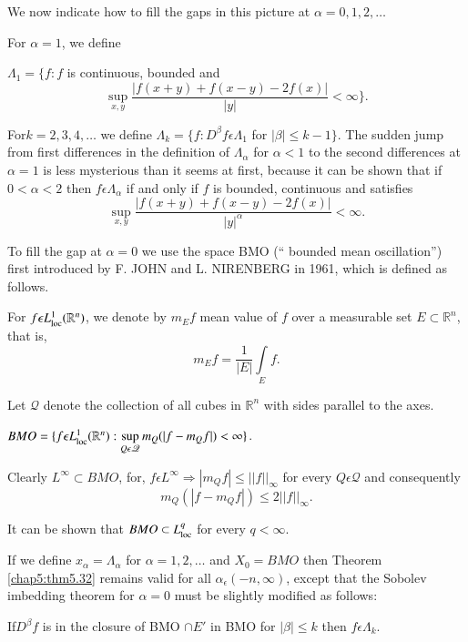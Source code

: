 We now indicate how to fill the gaps in this picture at $\alpha = 0, 1
, 2, \ldots$ 

For $\alpha = 1$, we define 

$ \Lambda_1 = \{f:f$ is continuous, bounded and 
$$
\sup_{x,y} \frac{ | f(x+y) + f(x-y) - 2f(x) | }{  | y  | } < \infty \}.
$$

For\pageoriginale $k= 2,3,4, \ldots$ we define $ \Lambda _k = \{f : D^\beta f
\epsilon \Lambda_1$ for  $| \beta | \le k-1\}$. The sudden jump
from first differences in the definition of $ \Lambda_\alpha$ for
$\alpha < 1 $ to the second differences at      $\alpha =1$ is less
mysterious than it seems at first, because it can be shown that if $ 0
< \alpha < 2$ then $ f \epsilon \Lambda_\alpha$ if and only if $f$
is bounded, continuous and satisfies  
$$
\sup_{x,y} \frac{ | f(x+y) + f(x-y) - 2f(x) |}{ | y |^\alpha} < \infty.
$$  

To fill the gap at $\alpha =0 $ we use the space BMO (`` bounded mean
oscillation'') first introduced by F. JOHN and L. NIRENBERG in
1961, which is defined as follows. 

For $f \epsilon L^1_{\operatorname{loc}} (\mathbb{R}^n)$, we denote by $m_Ef$ mean
value of $f$ over a measurable set $E\subset \mathbb{R}^n$, that is, 
$$
m_Ef = \frac{1}{ | E  |} \int\limits_E f.
$$

Let $\mathcal{Q}$ denote the collection of all cubes in $\mathbb{R}^n$ with sides
parallel to the axes. 

\setcounter{defi}{33}
\begin{defi}\label{chap5:def5.34}%
  $BMO = \{f \epsilon L^1_{\operatorname{loc}} (\mathbb{R}^n) : \sup\limits_{Q
    \epsilon \mathscr{Q} } m_Q ( | f - m_Q f  | )< \infty \}$.  
  
  Clearly $L^{\infty} \subset BMO$,  for, $f \epsilon L^\infty
  \Rightarrow  | m_Q f  | \le  ||  f  ||_\infty$ for every $Q
  \epsilon \mathscr{Q}$ and consequently 
  $$
  m_Q ( | f - m_Q f  | ) \le  2 ||  f  ||_\infty.
  $$
\end{defi}

It can be shown that $BMO \subset L^q_{\operatorname{loc}}$ for every $q < \infty$.

If we define $x_\alpha =  \Lambda_\alpha$ for $ \alpha = 1,2,  \ldots$
and $X_0 = BMO$ then Theorem \ref{chap5:thm5.32} remains valid for all
$\alpha_{\epsilon} (-n, \infty)$, except that the Sobolev
imbedding theorem for $\alpha = 0$ must be slightly modified as
follows:  

If\pageoriginale $D^\beta f$ is in the closure of BMO $\cap E'$ in BMO for $ |
\beta | \le k$ then $ f \epsilon \Lambda_k$. 

